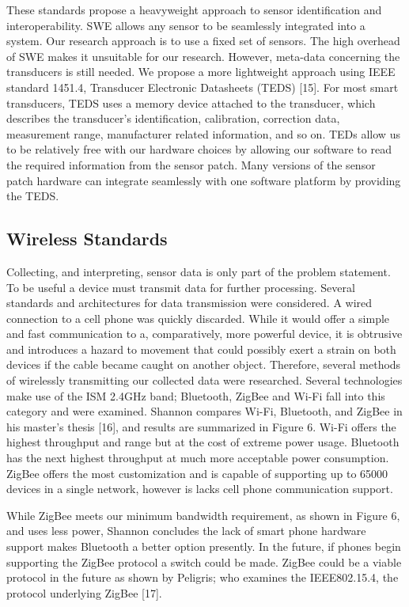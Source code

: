 These standards propose a heavyweight approach to sensor identification and interoperability. SWE allows any sensor to be seamlessly integrated into a system. Our research approach is to use a fixed set of sensors. The high overhead of SWE makes it unsuitable for our research. However, meta-data concerning the transducers is still needed. We propose a more lightweight approach using IEEE standard 1451.4, Transducer Electronic Datasheets (TEDS) [15]. For most smart transducers, TEDS uses a memory device attached to the transducer, which describes the transducer’s identification, calibration, correction data, measurement range, manufacturer related information, and so on. TEDs allow us to be relatively free with our hardware choices by allowing our software to read the required information from the sensor patch. Many versions of the sensor patch hardware can integrate seamlessly with one software platform by providing the TEDS.

\subsection{Wireless Standards}
Collecting, and interpreting, sensor data is only part of the problem statement. To be useful a device must transmit data for further processing. Several standards and architectures for data transmission were considered. A wired connection to a cell phone was quickly discarded. While it would offer a simple and fast communication to a, comparatively, more powerful device, it is obtrusive and introduces a hazard to movement that could possibly exert a strain on both devices if the cable became caught on another object. Therefore, several methods of wirelessly transmitting our collected data were researched. Several technologies make use of the ISM 2.4GHz band; Bluetooth, ZigBee and Wi-Fi fall into this category and were examined.  Shannon compares Wi-Fi, Bluetooth, and ZigBee in his master’s thesis [16], and results are summarized in Figure 6. Wi-Fi offers the highest throughput and range but at the cost of extreme power usage. Bluetooth has the next highest throughput at much more acceptable power consumption. ZigBee offers the most customization and is capable of supporting up to 65000 devices in a single network, however is lacks cell phone communication support.

While ZigBee meets our minimum bandwidth requirement, as shown in Figure 6, and uses less power, Shannon concludes the lack of smart phone hardware support makes Bluetooth a better option presently. In the future, if phones begin supporting the ZigBee protocol a switch could be made.  ZigBee could be a viable protocol in the future as shown by Peligris; who examines the IEEE802.15.4, the protocol underlying ZigBee [17].

